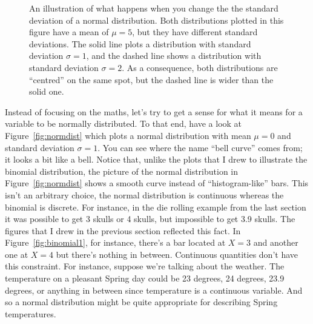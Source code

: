 \begin{figure}[t]
\begin{center}
\caption{An illustration of what happens when you change the the standard deviation of a normal distribution. Both distributions plotted in this figure have a mean of $\mu = 5$, but they have different standard deviations. The solid line plots a distribution with standard deviation $\sigma=1$, and the dashed line shows a distribution with standard deviation $\sigma = 2$. As a consequence, both distributions are ``centred'' on the same spot, but the dashed line is wider than the solid one.}
\label{fig:normsd}
\HR
\end{center}
\end{figure}

Instead of focusing on the maths, let's try to get a sense for what it means for a variable to be normally distributed. To that end, have a look at Figure~\ref{fig:normdist} which plots a normal distribution with mean $\mu = 0$ and standard deviation $\sigma = 1$. You can see where the name ``bell curve'' comes from; it looks a bit like a bell. Notice that, unlike the plots that I drew to illustrate the binomial distribution, the picture of the normal distribution in Figure~\ref{fig:normdist} shows a smooth curve instead of ``histogram-like'' bars. This isn't an arbitrary choice, the normal distribution is continuous whereas the binomial is discrete. For instance, in the die rolling example from the last section it was possible to get 3 skulls or 4 skulls, but impossible to get 3.9 skulls. The figures that I drew in the previous section reflected this fact. In Figure~\ref{fig:binomial1}, for instance, there's a bar located at $X=3$ and another one at $X=4$ but there's nothing in between. Continuous quantities don't have this constraint. For instance, suppose we're talking about the weather. The temperature on a pleasant Spring day could be 23 degrees, 24 degrees, 23.9 degrees, or anything in between since temperature is a continuous variable. And so a normal distribution might be quite appropriate for describing Spring temperatures. 

